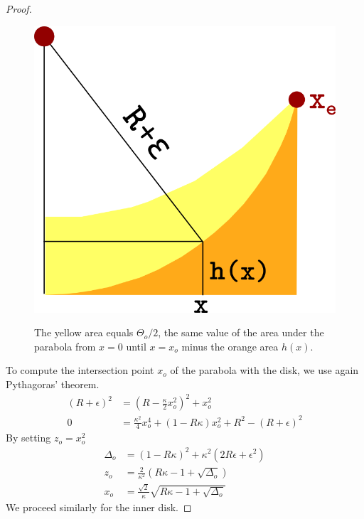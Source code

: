 \begin{proof}
\begin{figure}[h]
{\includegraphics[scale=0.35]{figures/appendix-max-energy/parabola-approx-2.png}
	}
\caption{The yellow area equals $\Theta_o /2$, the same value of the area under the parabola from $x=0$ until $x=x_o$ minus the orange area $h(x)$.}
\end{figure}


To compute the intersection point $x_o$ of the parabola with the disk, we use again Pythagoras' theorem.
\begin{align*}
	(R+\epsilon)^2 &= (R-\frac{\kappa}{2}x_o^2)^2 + x_o^2\\
	0 &= \frac{\kappa^2}{4}x_o^4 + (1-R\kappa)x_o^2 + R^2 - (R+\epsilon)^2
\end{align*}
%
By setting $z_o=x_o^2$
\begin{align*}
\Delta_o &= (1-R\kappa)^2 + \kappa^2(2R\epsilon + \epsilon^2)\\
z_o &= \frac{2}{\kappa^2}(R\kappa-1 + \sqrt{\Delta_o})\\
x_o &= \frac{\sqrt{2}}{\kappa}\sqrt{R\kappa-1+\sqrt{\Delta_o}}
\end{align*}
%
We proceed similarly for the inner disk.



\end{proof}
